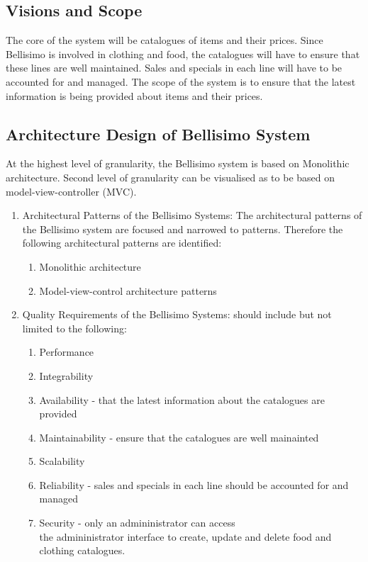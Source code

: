 \documentclass[12pt]{article}
\begin{document}
\subsection{Visions and Scope}
The core of the system will be catalogues of items and their prices. Since Bellisimo is involved in clothing and food, the catalogues will have to ensure that these lines are well maintained. Sales and specials in each line will have to be accounted for and managed. The scope of the system is to ensure that the latest information is being provided about items and their prices.

\subsection{Architecture Design of Bellisimo System}
At the highest level of granularity, the Bellisimo system is based on Monolithic architecture. Second level of granularity can be visualised as to be based on model-view-controller (MVC).

\begin{enumerate}
\item Architectural Patterns of the Bellisimo Systems: The architectural patterns of the Bellisimo system are focused and narrowed to patterns.   Therefore the   following architectural patterns are  identified: 
\newpage
\begin{enumerate}

\item Monolithic architecture 
\item Model-view-control architecture patterns 

\end{enumerate}
\item Quality Requirements of  the Bellisimo Systems: should include but not limited to the following:\begin{enumerate}
\item Performance 
\item Integrability
\item Availability - that the latest information about the catalogues are provided 
\item Maintainability - ensure that the catalogues are well mainainted 
\item Scalability
\item Reliability - sales and specials in each line should be accounted for and managed 
\item Security - only an admininistrator can access \\the admininistrator interface to create, update and delete food and clothing catalogues.

\end{enumerate}

\end{enumerate}
\end{document}
